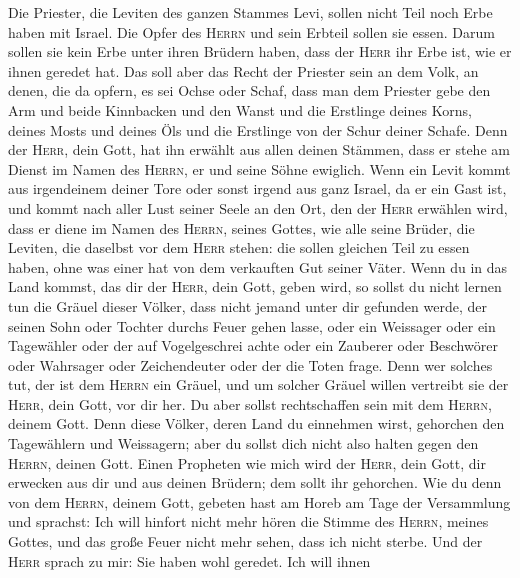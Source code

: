  Die Priester, die Leviten des ganzen Stammes Levi, sollen
nicht Teil noch Erbe haben mit Israel. Die Opfer des \textsc{Herrn} und
sein Erbteil sollen sie essen.  Darum sollen sie kein Erbe
unter ihren Brüdern haben, dass der \textsc{Herr} ihr Erbe ist, wie er
ihnen geredet hat.  Das soll aber das Recht der Priester
sein an dem Volk, an denen, die da opfern, es sei Ochse oder Schaf, dass
man dem Priester gebe den Arm und beide Kinnbacken und den Wanst
 und die Erstlinge deines Korns, deines Mosts und deines
Öls und die Erstlinge von der Schur deiner Schafe.  Denn
der \textsc{Herr}, dein Gott, hat ihn erwählt aus allen deinen Stämmen,
dass er stehe am Dienst im Namen des \textsc{Herrn}, er und seine Söhne
ewiglich.  Wenn ein Levit kommt aus irgendeinem deiner
Tore oder sonst irgend aus ganz Israel, da er ein Gast ist, und kommt
nach aller Lust seiner Seele an den Ort, den der \textsc{Herr} erwählen
wird,  dass er diene im Namen des \textsc{Herrn}, seines
Gottes, wie alle seine Brüder, die Leviten, die daselbst vor dem
\textsc{Herr} stehen:  die sollen gleichen Teil zu essen
haben, ohne was einer hat von dem verkauften Gut seiner Väter.
 Wenn du in das Land kommst, das dir der \textsc{Herr},
dein Gott, geben wird, so sollst du nicht lernen tun die Gräuel dieser
Völker,  dass nicht jemand unter dir gefunden werde, der
seinen Sohn oder Tochter durchs Feuer gehen lasse, oder ein Weissager
oder ein Tagewähler oder der auf Vogelgeschrei achte oder ein Zauberer
 oder Beschwörer oder Wahrsager oder Zeichendeuter oder
der die Toten frage.  Denn wer solches tut, der ist dem
\textsc{Herrn} ein Gräuel, und um solcher Gräuel willen vertreibt sie
der \textsc{Herr}, dein Gott, vor dir her.  Du aber
sollst rechtschaffen sein mit dem \textsc{Herrn}, deinem Gott.
 Denn diese Völker, deren Land du einnehmen wirst,
gehorchen den Tagewählern und Weissagern; aber du sollst dich nicht also
halten gegen den \textsc{Herrn}, deinen Gott.  Einen
Propheten wie mich wird der \textsc{Herr}, dein Gott, dir erwecken aus
dir und aus deinen Brüdern; dem sollt ihr gehorchen.  Wie
du denn von dem \textsc{Herrn}, deinem Gott, gebeten hast am Horeb am
Tage der Versammlung und sprachst: Ich will hinfort nicht mehr hören die
Stimme des \textsc{Herrn}, meines Gottes, und das große Feuer nicht mehr
sehen, dass ich nicht sterbe.  Und der \textsc{Herr}
sprach zu mir: Sie haben wohl geredet.  Ich will ihnen
